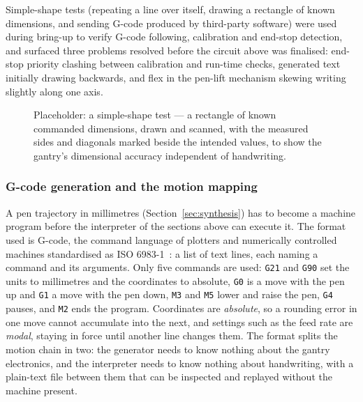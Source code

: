 Simple-shape tests (repeating a line over itself, drawing a rectangle of known dimensions, and sending G-code produced by third-party software) were used during bring-up to verify G-code following, calibration and end-stop detection, and surfaced three problems resolved before the circuit above was finalised: end-stop priority clashing between calibration and run-time checks, generated text initially drawing backwards, and flex in the pen-lift mechanism skewing writing slightly along one axis.

\begin{figure}[htb]
\centering
{}
\captionsetup{singlelinecheck=false,justification=justified}
\caption{Placeholder: a simple-shape test --- a rectangle of known commanded dimensions, drawn and scanned, with the measured sides and diagonals marked beside the intended values, to show the gantry's dimensional accuracy independent of handwriting.}
\label{fig:gan-rect}
\end{figure}

\subsubsection{G-code generation and the motion mapping}
\label{sec:gcode}

A pen trajectory in millimetres (Section~\ref{sec:synthesis}) has to become a machine program before the interpreter of the sections above can execute it. The format used is G-code, the command language of plotters and numerically controlled machines standardised as ISO 6983-1~\cite{iso6983}: a list of text lines, each naming a command and its arguments. Only five commands are used: \texttt{G21} and \texttt{G90} set the units to millimetres and the coordinates to absolute, \texttt{G0} is a move with the pen up and \texttt{G1} a move with the pen down, \texttt{M3} and \texttt{M5} lower and raise the pen, \texttt{G4} pauses, and \texttt{M2} ends the program. Coordinates are \emph{absolute}, so a rounding error in one move cannot accumulate into the next, and settings such as the feed rate are \emph{modal}, staying in force until another line changes them. The format splits the motion chain in two: the generator needs to know nothing about the gantry electronics, and the interpreter needs to know nothing about handwriting, with a plain-text file between them that can be inspected and replayed without the machine present.

